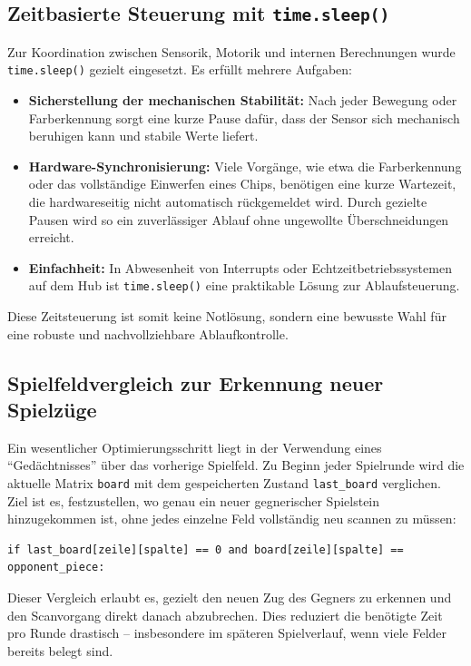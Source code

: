 \subsection{Zeitbasierte Steuerung mit \texttt{time.sleep()}}

Zur Koordination zwischen Sensorik, Motorik und internen Berechnungen wurde \texttt{time.sleep()} gezielt eingesetzt. Es erfüllt mehrere Aufgaben:

\begin{itemize}
	\item \textbf{Sicherstellung der mechanischen Stabilität:} Nach jeder Bewegung oder Farberkennung sorgt eine kurze Pause dafür, dass der Sensor sich mechanisch beruhigen kann und stabile Werte liefert.
	\item \textbf{Hardware-Synchronisierung:} Viele Vorgänge, wie etwa die Farberkennung oder das vollständige Einwerfen eines Chips, benötigen eine kurze Wartezeit, die hardwareseitig nicht automatisch rückgemeldet wird. Durch gezielte Pausen wird so ein zuverlässiger Ablauf ohne ungewollte Überschneidungen erreicht.
	\item \textbf{Einfachheit:} In Abwesenheit von Interrupts oder Echtzeitbetriebssystemen auf dem Hub ist \texttt{time.sleep()} eine praktikable Lösung zur Ablaufsteuerung.
\end{itemize}

Diese Zeitsteuerung ist somit keine Notlösung, sondern eine bewusste Wahl für eine robuste und nachvollziehbare Ablaufkontrolle.

\subsection{Spielfeldvergleich zur Erkennung neuer Spielzüge}

Ein wesentlicher Optimierungsschritt liegt in der Verwendung eines ``Gedächtnisses'' über das vorherige Spielfeld. Zu Beginn jeder Spielrunde wird die aktuelle Matrix \texttt{board} mit dem gespeicherten Zustand \texttt{last\_board} verglichen. Ziel ist es, festzustellen, wo genau ein neuer gegnerischer Spielstein hinzugekommen ist, ohne jedes einzelne Feld vollständig neu scannen zu müssen:

\begin{lstlisting}[style=pythonstyle]
	if last_board[zeile][spalte] == 0 and board[zeile][spalte] == opponent_piece:
\end{lstlisting}

Dieser Vergleich erlaubt es, gezielt den neuen Zug des Gegners zu erkennen und den Scanvorgang direkt danach abzubrechen. Dies reduziert die benötigte Zeit pro Runde drastisch – insbesondere im späteren Spielverlauf, wenn viele Felder bereits belegt sind.

